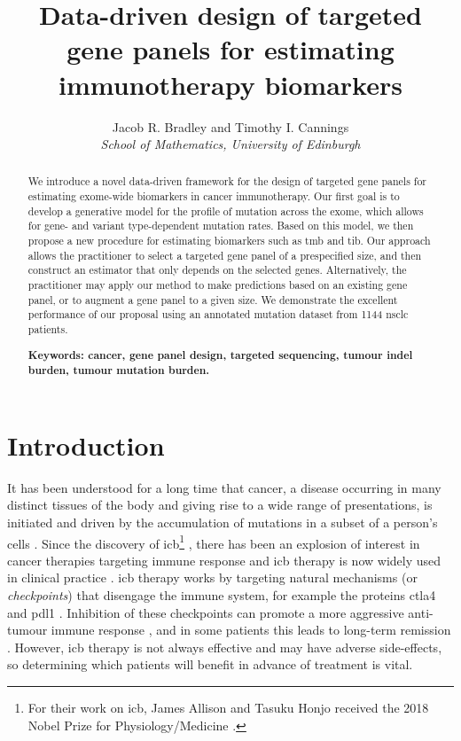 \documentclass[12pt]{article}
\title{Data-driven design of targeted gene panels for estimating immunotherapy biomarkers}
\author{Jacob R. Bradley and Timothy I. Cannings
 \\ \emph{School of Mathematics, University of Edinburgh}}
\date{}
\begin{document}
\maketitle
\begin{abstract}
We introduce a novel data-driven framework for the design of targeted gene panels for estimating exome-wide biomarkers in cancer immunotherapy. Our first goal is to develop a generative model for the profile of mutation across the exome, which allows for gene- and variant type-dependent mutation rates. Based on this model, we then propose a new procedure for estimating biomarkers such as \acrlong{tmb} and \acrlong{tib}.  Our approach allows the practitioner to select a targeted gene panel of a prespecified size, and then construct an estimator that only depends on the selected genes.  Alternatively, the practitioner may apply our method to make predictions based on an existing gene panel, or to augment a gene panel to a given size. We demonstrate the excellent performance of our proposal using an annotated mutation dataset from 1144 \acrlong{nsclc} patients. 



\textbf{Keywords: cancer, gene panel design, targeted sequencing, tumour indel burden, tumour mutation burden.}
\end{abstract}


\section{Introduction}
It has been understood for a long time that cancer, a disease occurring in many distinct tissues of the body and giving rise to a wide range of presentations, is initiated and driven by the accumulation of mutations in a subset of a person's cells \citep{boveri_concerning_2008}.  Since the discovery of \gls{icb}\footnote{For their work on \gls{icb}, James Allison and Tasuku Honjo received the 2018 Nobel Prize for Physiology/Medicine \citep{ledford_cancer_2018}.}  \citep{ishida_induced_1992,leach_enhancement_1996},  there has been an explosion of interest in cancer therapies targeting immune response and \gls{icb} therapy is now widely used in clinical practice \citep{robert_decade_2020}.  \gls{icb} therapy works by targeting natural mechanisms (or \emph{checkpoints}) that disengage the immune system, for example the proteins \gls{ctla4} and \gls{pdl1} \citep{buchbinder_ctla-4_2016}. Inhibition of these checkpoints can promote a more aggressive anti-tumour immune response \citep{pardoll_blockade_2012}, and in some patients this leads to long-term remission \citep{gettinger_5-year_2019}. However, \gls{icb} therapy is not always effective \citep{nowicki_mechanisms_2018} and may have adverse side-effects, so determining which patients will benefit in advance of treatment is vital. 
\end{document}
